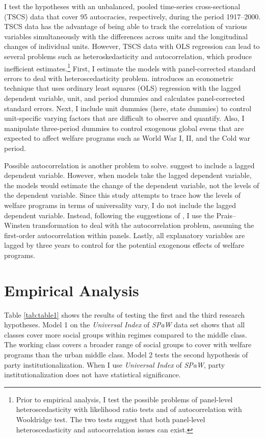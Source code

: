 \documentclass[11pt]{article}
\begin{document}
I test the hypotheses with an unbalanced, pooled time-series cross-sectional (TSCS) data that cover 95 autocracies, respectively, during the period 1917–2000. TSCS data has the advantage of being able to track the correlation of various variables simultaneously with the differences across units and the longitudinal changes of individual units. However, TSCS data with OLS regression can lead to several problems such as heteroskedasticity and autocorrelation, which produce inefficient estimates.\footnote{Prior to empirical analysis, I test the possible problems of panel-level heteroscedasticity with likelihood ratio tests and of autocorrelation with Wooldridge test. The two tests suggest that both panel-level heteroscedasticity and autocorrelation issues can exist.} First, I estimate the models with panel-corrected standard errors to deal with heteroscedasticity problem. \citet{Beck1995} introduces an econometric technique that uses ordinary least squares (OLS) regression with the lagged dependent variable, unit, and period dummies and calculates panel-corrected standard errors. Next, I include unit dummies (here, state dummies) to control unit-specific varying factors that are difficult to observe and quantify. Also, I manipulate three-period dummies to control exogenous global evens that are expected to affect welfare programs such as World War I, II, and the Cold war period.

Possible autocorrelation is another problem to solve. \citet{Beck1995} suggest to include a lagged dependent variable. However, when models take the lagged dependent variable, the models would estimate the change of the dependent variable, not the levels of the dependent variable. Since this study attempts to trace how the levels of welfare programs in terms of universality vary, I do not include the lagged dependent variable. Instead, following the suggestions of \citet{Plumper2005}, I use the Prais–Winsten transformation to deal with the autocorrelation problem, assuming the first-order autocorrelation within panels. Lastly, all explanatory variables are lagged by three years to control for the potential exogenous effects of welfare programs.

\section{Empirical Analysis}
Table \ref{tab:table1} shows the results of testing the first and the third research hypotheses. Model 1 on the \textit{Universal Index} of \textit{SPaW} data set shows that all classes cover more social groups within regimes compared to the middle class. The working class covers a broader range of social groups to cover with welfare programs than the urban middle class. Model 2 tests the second hypothesis of party institutionalization. When I use \textit{Universal Index} of \textit{SPaW}, party institutionalization does not have statistical significance. 
\end{document}
